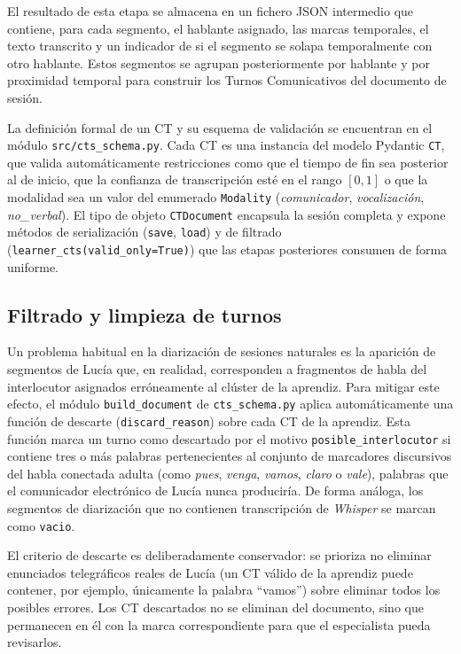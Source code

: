 El resultado de esta etapa se almacena en un fichero \ac{JSON} intermedio que contiene,
para cada segmento, el hablante asignado, las marcas temporales, el texto transcrito y
un indicador de si el segmento se solapa temporalmente con otro hablante. Estos
segmentos se agrupan posteriormente por hablante y por proximidad temporal para
construir los Turnos Comunicativos del documento de sesión.

La definición formal de un \ac{CT} y su esquema de validación se encuentran en el módulo
\texttt{src/cts\_schema.py}. Cada \ac{CT} es una instancia del modelo Pydantic
\texttt{CT}, que valida automáticamente restricciones como que el tiempo de fin sea
posterior al de inicio, que la confianza de transcripción esté en el rango $[0,1]$ o
que la modalidad sea un valor del enumerado \texttt{Modality} (\emph{comunicador},
\emph{vocalización}, \emph{no\_verbal}). El tipo de objeto \texttt{CTDocument}
encapsula la sesión completa y expone métodos de serialización (\texttt{save},
\texttt{load}) y de filtrado (\texttt{learner\_cts(valid\_only=True)}) que las etapas
posteriores consumen de forma uniforme.


\subsection{Filtrado y limpieza de turnos}
\label{subsec:diar_filtrado}

Un problema habitual en la diarización de sesiones naturales es la aparición de
segmentos de Lucía que, en realidad, corresponden a fragmentos de habla del
interlocutor asignados erróneamente al clúster de la aprendiz. Para mitigar este
efecto, el módulo \texttt{build\_document} de \texttt{cts\_schema.py} aplica
automáticamente una función de descarte (\texttt{discard\_reason}) sobre cada \ac{CT}
de la aprendiz. Esta función marca un turno como descartado por el motivo
\texttt{posible\_interlocutor} si contiene tres o más palabras pertenecientes al
conjunto de marcadores discursivos del habla conectada adulta (como \emph{pues},
\emph{venga}, \emph{vamos}, \emph{claro} o \emph{vale}), palabras que el comunicador
electrónico de Lucía nunca produciría. De forma análoga, los segmentos de diarización
que no contienen transcripción de \emph{Whisper} se marcan como \texttt{vacio}.

El criterio de descarte es deliberadamente conservador: se prioriza no eliminar
enunciados telegráficos reales de Lucía (un \ac{CT} válido de la aprendiz puede
contener, por ejemplo, únicamente la palabra ``vamos'') sobre eliminar todos los
posibles errores. Los \ac{CT} descartados no se eliminan del documento, sino que
permanecen en él con la marca correspondiente para que el especialista pueda
revisarlos.

